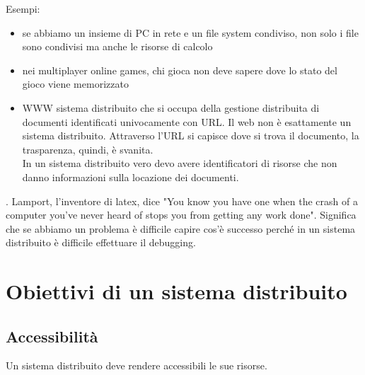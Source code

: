 \newpage
Esempi: 
\begin{itemize}
    \item se abbiamo un insieme di PC in rete e un file system condiviso, non solo i file sono condivisi ma anche le risorse di calcolo
    \item nei multiplayer online games, chi gioca non deve sapere dove lo stato del gioco viene memorizzato
    \item WWW sistema distribuito che si occupa della gestione distribuita di documenti identificati univocamente con URL. Il web non è esattamente un sistema distribuito. Attraverso l'URL si capisce dove si trova il documento, la trasparenza, quindi, è svanita. \\
    In un sistema distribuito vero devo avere identificatori di risorse che non danno informazioni sulla locazione dei documenti.
\end{itemize}.
Lamport, l'inventore di latex, dice "You know you have one when the crash of a computer you've never heard of stops you from getting any work done".
Significa che se abbiamo un problema è difficile capire cos'è successo perché in un sistema distribuito è difficile effettuare il debugging. 


\chapter{Obiettivi di un sistema distribuito}

\section{Accessibilità}
Un sistema distribuito deve rendere accessibili le sue risorse.


